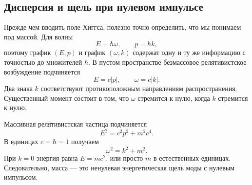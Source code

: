 \subsection{Дисперсия и щель при нулевом импульсе}

Прежде чем вводить поле Хиггса, полезно точно определить, что мы понимаем под массой. Для волны \begin{equation}
  E=\hbar\omega,
  \qquad
  p=\hbar k,
  \label{eq:l08-quantum-wave}
\end{equation} поэтому график \((E,p)\) и график \((\omega,k)\) содержат одну и ту же информацию с точностью до множителей \(\hbar\). В пустом пространстве безмассовое релятивистское возбуждение подчиняется \begin{equation}
  E=c|p|,
  \qquad
  \omega=c|k|.
  \label{eq:l08-massless-dispersion}
\end{equation} Два знака \(k\) соответствуют противоположным направлениям распространения. Существенный момент состоит в том, что \(\omega\) стремится к нулю, когда \(k\) стремится к нулю.

Массивная релятивистская частица подчиняется \begin{equation}
  E^2=c^2p^2+m^2c^4.
  \label{eq:l08-massive-dispersion}
\end{equation} В единицах \(c=\hbar=1\) получаем \begin{equation}
  \omega^2=k^2+m^2.
\end{equation} При \(k=0\) энергия равна \(E=mc^2\), или просто \(m\) в естественных единицах. Следовательно, масса — это ненулевая энергетическая щель моды с нулевым импульсом.

